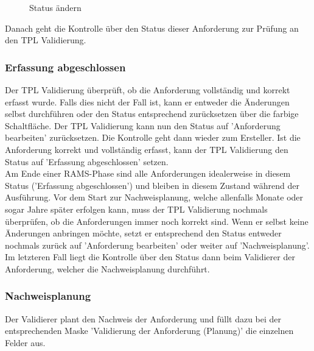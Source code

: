 \begin{figure}[H]
\caption{Status ändern}
\end{figure}

Danach geht die Kontrolle über den Status dieser Anforderung zur Prüfung an den TPL Validierung. 

\subsubsection{Erfassung abgeschlossen}

Der TPL Validierung überprüft, ob die Anforderung vollständig und korrekt erfasst wurde. Falls dies nicht der Fall ist, kann er entweder die Änderungen selbst durchführen oder den Status entsprechend zurücksetzen über die farbige Schaltfläche. Der TPL Validierung kann nun den Status auf 'Anforderung bearbeiten' zurücksetzen. Die Kontrolle geht dann wieder zum Ersteller. Ist die Anforderung korrekt und vollständig erfasst, kann der TPL Validierung den Status auf 'Erfassung abgeschlossen' setzen. \\

Am Ende einer RAMS-Phase sind alle Anforderungen idealerweise in diesem Status ('Erfassung abgeschlossen') und bleiben in diesem Zustand während der Ausführung. Vor dem Start zur Nachweisplanung, welche allenfalls Monate oder sogar Jahre später erfolgen kann, muss der TPL Validierung nochmals überprüfen, ob die Anforderungen immer noch korrekt sind. Wenn er selbst keine Änderungen anbringen möchte, setzt er entsprechend den Status entweder nochmals zurück auf 'Anforderung bearbeiten' oder weiter auf 'Nachweisplanung'. Im letzteren Fall liegt die Kontrolle über den Status dann beim Validierer der Anforderung, welcher die Nachweisplanung durchführt. 

\subsubsection{Nachweisplanung}
\label{bkm:Ref2018071811}

Der Validierer plant den Nachweis der Anforderung und füllt dazu bei der entsprechenden Maske 'Validierung der Anforderung (Planung)'  die einzelnen Felder aus. 

